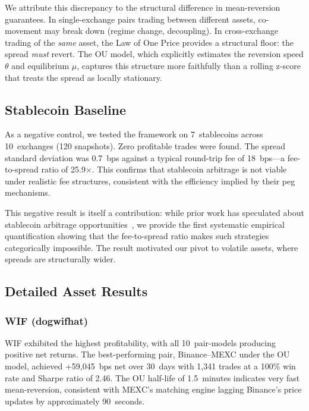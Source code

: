 \documentclass[sigconf,nonacm=false]{acmart}
\begin{document}
We attribute this discrepancy to the structural difference in mean-reversion guarantees. In single-exchange pairs trading between different assets, co-movement may break down (regime change, decoupling). In cross-exchange trading of the \emph{same} asset, the Law of One Price provides a structural floor: the spread \emph{must} revert. The OU model, which explicitly estimates the reversion speed $\theta$ and equilibrium $\mu$, captures this structure more faithfully than a rolling z-score that treats the spread as locally stationary.

\subsection{Stablecoin Baseline}

As a negative control, we tested the framework on 7~stablecoins across 10~exchanges (120 snapshots). Zero profitable trades were found. The spread standard deviation was 0.7~bps against a typical round-trip fee of 18~bps---a fee-to-spread ratio of 25.9$\times$. This confirms that stablecoin arbitrage is not viable under realistic fee structures, consistent with the efficiency implied by their peg mechanisms.

This negative result is itself a contribution: while prior work has speculated about stablecoin arbitrage opportunities~\cite{makarov2020trading}, we provide the first systematic empirical quantification showing that the fee-to-spread ratio makes such strategies categorically impossible. The result motivated our pivot to volatile assets, where spreads are structurally wider.

\subsection{Detailed Asset Results}

\subsubsection{WIF (dogwifhat)}

WIF exhibited the highest profitability, with all 10~pair-models producing positive net returns. The best-performing pair, Binance--MEXC under the OU model, achieved +59,045~bps net over 30~days with 1,341 trades at a 100\% win rate and Sharpe ratio of 2.46. The OU half-life of 1.5~minutes indicates very fast mean-reversion, consistent with MEXC's matching engine lagging Binance's price updates by approximately 90~seconds.
\end{document}
